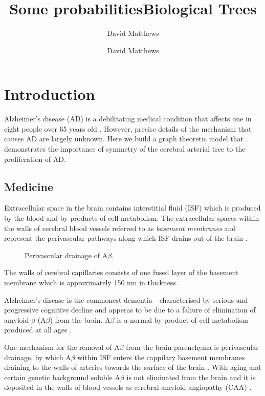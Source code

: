 \documentclass[12pt]{article} %
\title{Some probabilities}
\author{David Matthews}
\theoremstyle{definition}
\begin{document}
\title{Biological Trees}
\author{David Matthews}

\section{Introduction}
Alzheimer's disease (AD) is a debilitating medical condition that affects one in eight people over 65 years old \cite{Bengt}.  However, precise details of the mechanism that causes AD are largely unknown.  Here we build a graph theoretic model that demonstrates the importance of symmetry of the cerebral arterial tree to the proliferation of AD.


\subsection{Medicine}

Extracellular space in the brain contains interstitial fluid (ISF) which is produced by the blood and by-products of cell metabolism.  The extracellular spaces within the walls of cerebral blood vessels referred to as \emph{basement membranes} and represent the perivascular pathways along which ISF drains out of the brain \cite{wellerperi,wellermicro,Rox}.  

\begin{figure}[H]

              \centering
                \caption{Perivascular drainage of A$\beta$.}
\end{figure}

The walls of cerebral capillaries consists of one fused layer of  the basement membrane which is approximately 150 nm in thickness.  

Alzheimer's disease is the commonest dementia - characterised by serious and progressive cognitive decline and apperas to be due to a faliure of elimination of amyloid-$\beta$ (A$\beta$) from the brain.  A$\beta$ is a normal by-product of cell metabolism produced at all ages \cite{}.

One mechanism for the removal of A$\beta$ from the brain parenchyma is perivascular drainage, by which A$\beta$ within ISF enters the cappilary basement membranes draining to the walls of arteries towards the surface of the brain \cite{Rox}\cite{wellerperi}.  With aging and certain genetic background soluble A$\beta$ is not eliminated from the brain and it is deposited in the walls of blood vessels as cerebral amyloid angiopathy (CAA) \cite{Lowe}.  
\end{document}
